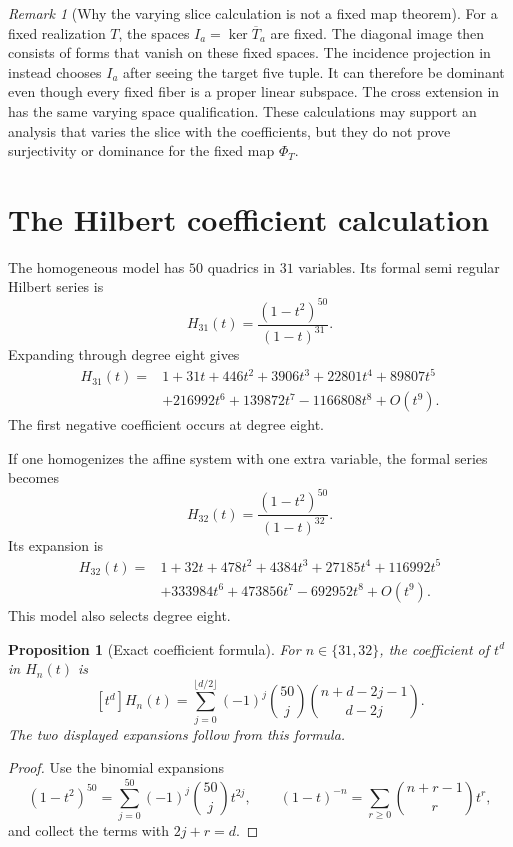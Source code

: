 \documentclass[11pt]{article}
\theoremstyle{plain}
\newtheorem{proposition}[theorem]{Proposition}
\theoremstyle{definition}
\theoremstyle{remark}
\newtheorem{remark}[theorem]{Remark}
\begin{document}
\begin{remark}[Why the varying slice calculation is not a fixed map theorem]
For a fixed realization $T$, the spaces $I_a=\ker\overline T_a$ are fixed.
The diagonal image then consists of forms that vanish on these fixed spaces.
The incidence projection in  instead chooses $I_a$
after seeing the target five tuple.  It can therefore be dominant even though
every fixed fiber is a proper linear subspace.  The cross extension in
 has the same varying space qualification.  These
calculations may support an analysis that varies the slice with the
coefficients, but they do not prove surjectivity or dominance for the fixed
map $\Phi_T$.
\end{remark}

\section{The Hilbert coefficient calculation}
\label{sec:hilbert}

The homogeneous model has $50$ quadrics in $31$ variables.  Its formal
semi regular Hilbert series is
\[
  H_{31}(t)=\frac{(1-t^2)^{50}}{(1-t)^{31}}.
\]
Expanding through degree eight gives
\begin{align*}
 H_{31}(t)={}&1+31t+446t^2+3906t^3+22801t^4
 +89807t^5\\
 &+216992t^6+139872t^7-1166808t^8+O(t^9).
\end{align*}
The first negative coefficient occurs at degree eight.

If one homogenizes the affine system with one extra variable, the formal
series becomes
\[
  H_{32}(t)=\frac{(1-t^2)^{50}}{(1-t)^{32}}.
\]
Its expansion is
\begin{align*}
 H_{32}(t)={}&1+32t+478t^2+4384t^3+27185t^4
 +116992t^5\\
 &+333984t^6+473856t^7-692952t^8+O(t^9).
\end{align*}
This model also selects degree eight.

\begin{proposition}[Exact coefficient formula]
\label{prop:hilbert-coeff}
For $n\in\{31,32\}$, the coefficient of $t^d$ in $H_n(t)$ is
\[
  [t^d]H_n(t)
  =\sum_{j=0}^{\lfloor d/2\rfloor}
    (-1)^j\binom{50}{j}\binom{n+d-2j-1}{d-2j}.
\]
The two displayed expansions follow from this formula.
\end{proposition}

\begin{proof}
Use the binomial expansions
\[
 (1-t^2)^{50}=\sum_{j=0}^{50}(-1)^j\binom{50}{j}t^{2j},
 \qquad
 (1-t)^{-n}=\sum_{r\geq0}\binom{n+r-1}{r}t^r,
\]
and collect the terms with $2j+r=d$.
\end{proof}
\end{document}
